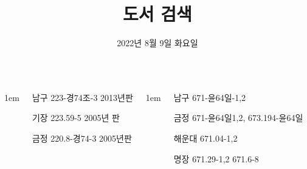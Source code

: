\documentclass[	20pt, 
							a1paper, 
							portrait, %
							margin=0mm, %
							innermargin=10mm,  		%
							colspace=5mm, 
							subcolspace=0mm
							]{tikzposter}
\title{도서 검색}
\author{ 2022년 8월 9일 화요일  }
\begin{document}
	\maketitle

	\begin{columns}


			{
					\setlength{\leftmargini}{7em}
					\setlength{\labelsep} {1em}
				\begin{LARGE}
남구 223-경74조-3   2013년판

기장  223.59-5         2005년 판

금정  220.8-경74-3  2005년판
				\end{LARGE}
			}


			{
					\setlength{\leftmargini}{7em}
					\setlength{\labelsep} {1em}
				\begin{LARGE}
남구 671-윤64일-1,2

금정 671-윤64일1,2,  673.194-윤64일

해운대  671.04-1,2    

명장    671.29-1,2   671.6-8
				\end{LARGE}
			}




\end{columns}
\end{document}
